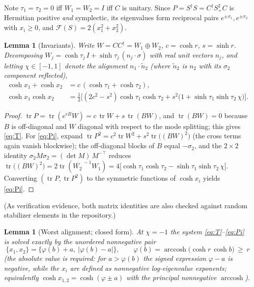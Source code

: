 \documentclass[11pt]{article}
\newtheorem{lemma}[theorem]{Lemma}
\theoremstyle{definition}
\theoremstyle{remark}
\newcommand{\tr}{\operatorname{tr}}
\newcommand{\dg}{\dagger}
\newcommand{\arccosh}{\operatorname{arccosh}}
\begin{document}
Note $\tau_1=\tau_2=0$ iff $W_1=W_2=I$ iff $C$ is unitary.  Since
$P=S^{\dg}S=C^{\dg}S_+^2C$ is Hermitian positive \emph{and} symplectic, its
eigenvalues form reciprocal pairs $e^{\pm x_1},e^{\pm x_2}$ with
$x_i\ge0$, and $\mathcal F(S)=2(x_1^2+x_2^2)$.

\begin{lemma}[Invariants]\label{lem:invariants}
Write $W=CC^{\dg}=W_1\oplus W_2$, $c=\cosh r$, $s=\sinh r$.  Decomposing
$W_j=\cosh\tau_j\,I+\sinh\tau_j\,(n_j\!\cdot\!\sigma)$ with real unit vectors
$n_j$, and letting $\chi\in[-1,1]$ denote the alignment
$n_1\!\cdot\!\tilde n_2$ (where $\tilde n_2$ is $n_2$ with its $\sigma_2$
component reflected),
\begin{align}
\cosh x_1+\cosh x_2 &= c\,(\cosh\tau_1+\cosh\tau_2), \label{eq:T}\\
\cosh x_1\cosh x_2 &= \tfrac12\Big[(2c^2-s^2)\cosh\tau_1\cosh\tau_2
+s^2\big(1+\sinh\tau_1\sinh\tau_2\,\chi\big)\Big]. \label{eq:Pi}
\end{align}
\end{lemma}

\begin{proof}
$\tr P=\tr(e^{rB}W)=c\,\tr W+s\,\tr(BW)$, and $\tr(BW)=0$ because $B$ is
off-diagonal and $W$ diagonal with respect to the mode splitting; this gives
\eqref{eq:T}.  For \eqref{eq:Pi}, expand
$\tr P^2=c^2\tr W^2+s^2\tr\big((BW)^2\big)$ (the cross terms again vanish
blockwise); the off-diagonal blocks of $B$ equal $-\sigma_2$, and the $2\times2$
identity $\sigma_2M\sigma_2=(\det M)\,M^{-\top}$ reduces
$\tr\big((BW)^2\big)=2\tr(\overline{W_2}^{\,-1}W_1)
=4\big[\cosh\tau_1\cosh\tau_2-\sinh\tau_1\sinh\tau_2\,\chi\big]$.
Converting $(\tr P,\tr P^2)$ to the symmetric functions of
$\cosh x_i$ yields \eqref{eq:Pi}.
\end{proof}

\noindent
(As verification evidence, both matrix identities are also checked against
random stabilizer elements in the repository.)

\begin{lemma}[Worst alignment; closed form]\label{lem:closedform}
At $\chi=-1$ the system \eqref{eq:T}--\eqref{eq:Pi} is solved exactly by
the unordered nonnegative pair
\begin{equation}\label{eq:xformula}
\{x_1,x_2\}=\big\{\varphi(b)+a,\ \big|\varphi(b)-a\big|\big\},
\qquad
\varphi(b)=\arccosh\big(\cosh r\,\cosh b\big)\ \ge\ r
\end{equation}
(the absolute value is required: for $a>\varphi(b)$ the signed expression
$\varphi-a$ is negative, while the $x_i$ are defined as nonnegative
log-eigenvalue exponents; equivalently
$\cosh x_{1,2}=\cosh(\varphi\pm a)$ with the principal nonnegative
$\arccosh$).
\end{lemma}
\end{document}
